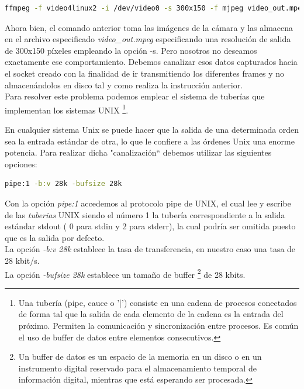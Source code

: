 \begin{lstlisting}[language=bash]
  ffmpeg -f video4linux2 -i /dev/video0 -s 300x150 -f mjpeg video_out.mpeg
\end{lstlisting}

Ahora bien, el comando anterior toma las imágenes de la cámara y las almacena en el archivo especificado \emph{ video\_out.mpeg} especificando una resolución de salida de 300x150 píxeles
empleando la opción -s. Pero nosotros no deseamos exactamente ese comportamiento. Debemos canalizar esos datos capturados hacia el socket creado con la finalidad de ir transmitiendo los 
diferentes frames y no almacenándolos en disco tal y como realiza la instrucción anterior.\\


Para resolver este problema podemos emplear el sistema de tuberías que implementan los sistemas UNIX \footnote{ Una tubería (pipe, cauce o '|') consiste en una cadena de 
procesos conectados de forma tal que la salida de cada elemento de la cadena es la entrada del próximo. Permiten la comunicación y sincronización entre procesos. Es común el uso de
buffer de datos entre elementos consecutivos. }.

En cualquier sistema Unix se puede hacer que la salida de una determinada orden sea la entrada estándar de otra, lo que le confiere a las órdenes Unix una enorme potencia.
Para realizar dicha "canalización`` debemos utilizar las siguientes opciones:\\

\begin{lstlisting}[language=bash]
  pipe:1 -b:v 28k -bufsize 28k
\end{lstlisting}


Con la opción \emph{pipe:1} accedemos al protocolo pipe de UNIX, el cual lee y escribe de las \emph{tuberias} UNIX siendo el número 1 la tubería correspondiente a la salida estándar 
stdout ( 0 para stdin y 2 para stderr), la cual podría ser omitida puesto que es la salida por defecto.\\

La opción \emph{-b:v 28k} establece la tasa de transferencia, en nuestro caso una tasa de 28 kbit/s.\\

La opción \emph{-bufsize 28k} establece un tamaño de buffer \footnote{Un buffer de datos es un espacio de la memoria en un disco o en un instrumento digital reservado para el almacenamiento
temporal de información digital, mientras que está esperando ser procesada.} de 28 kbits.\\

